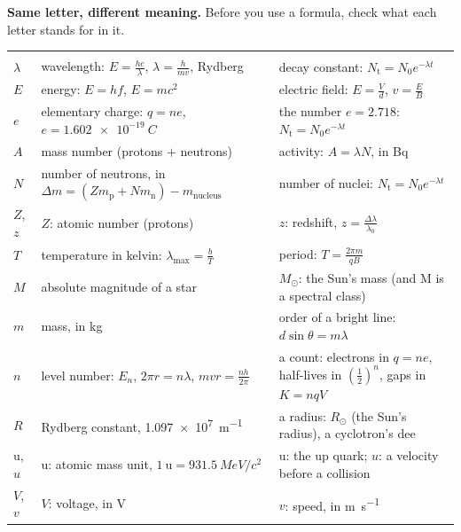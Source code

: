 \begin{mistakes}
\textbf{Same letter, different meaning.} Before you use a formula, check what each letter
stands for in it.\par\smallskip
\small\renewcommand{}%
\begin{tabular}{@{}L{12mm}L{60mm}L{62mm}@{}}
   &  & \\
  $\lambda$ & wavelength: $E = \frac{hc}{\lambda}$, $\lambda = \frac{h}{mv}$, Rydberg
    & decay constant: $N_\mathrm{t} = N_0 e^{-\lambda t}$\\
  $E$ & energy: $E = hf$, $E = mc^2$ & electric field: $E = \frac{V}{d}$,
    $v = \frac{E}{B}$\\
  $e$ & elementary charge: $q = ne$, $e = \qty{1.602e-19}{C}$ & the number $e = 2.718$:
    $N_\mathrm{t} = N_0 e^{-\lambda t}$\\
  $A$ & mass number (protons $+$ neutrons) & activity: $A = \lambda N$, in \si{Bq}\\
  $N$ & number of neutrons, in $\Delta m = (Zm_\mathrm{p} + Nm_\mathrm{n}) - m_\mathrm{nucleus}$
    & number of nuclei: $N_\mathrm{t} = N_0 e^{-\lambda t}$\\
  $Z$, $z$ & $Z$: atomic number (protons) & $z$: redshift, $z = \frac{\Delta\lambda}{\lambda_0}$\\
  $T$ & temperature in kelvin: $\lambda_\mathrm{max} = \frac{b}{T}$ & period:
    $T = \frac{2\pi m}{qB}$\\
  $M$ & absolute magnitude of a star & $M_\odot$: the Sun's mass (and M is a spectral
    class)\\
  $m$ & mass, in \si{kg} & order of a bright line: $d\sin\theta = m\lambda$\\
  $n$ & level number: $E_n$, $2\pi r = n\lambda$, $mvr = \frac{nh}{2\pi}$ & a count:
    electrons in $q = ne$, half-lives in $\left(\frac{1}{2}\right)^{n}$, gaps in $K = nqV$\\
  $R$ & Rydberg constant, \qty{1.097e7}{m^{-1}} & a radius: $R_\odot$ (the Sun's radius),
    a cyclotron's dee\\
  u, $u$ & u: atomic mass unit, $\qty{1}{\amu} = \qty{931.5}{MeV}/c^2$ & u: the up quark;
    $u$: a velocity before a collision\\
  $V$, $v$ & $V$: voltage, in \si{V} & $v$: speed, in \si{m.s^{-1}}\\
\end{tabular}
\end{mistakes}

